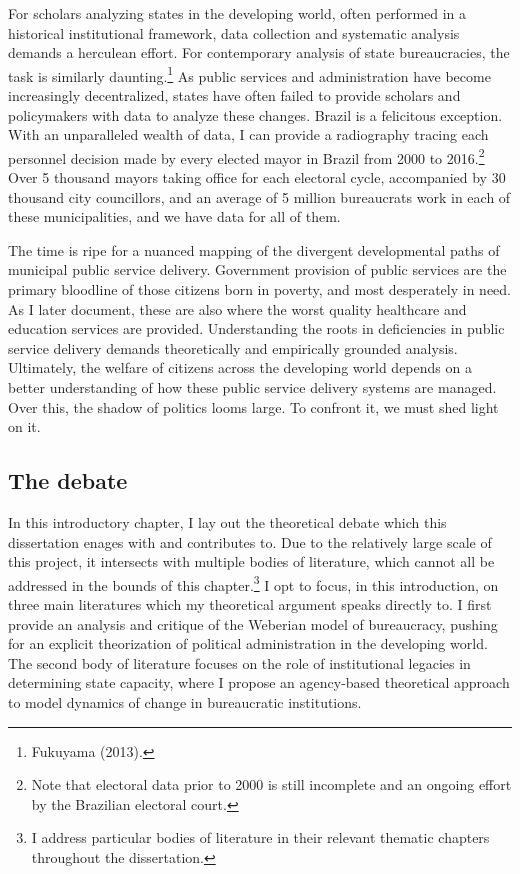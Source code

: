 \documentclass[12pt,]{article}
\let\rmarkdownfootnote\footnote%
\def\footnote{\protect\rmarkdownfootnote}
\begin{document}
For scholars analyzing states in the developing world, often performed
in a historical institutional framework, data collection and systematic
analysis demands a herculean effort. For contemporary analysis of state
bureaucracies, the task is similarly daunting.\footnote{Fukuyama (2013).}
As public services and administration have become increasingly
decentralized, states have often failed to provide scholars and
policymakers with data to analyze these changes. Brazil is a felicitous
exception. With an unparalleled wealth of data, I can provide a
radiography tracing each personnel decision made by every elected mayor
in Brazil from 2000 to 2016.\footnote{Note that electoral data prior to
  2000 is still incomplete and an ongoing effort by the Brazilian
  electoral court.} Over 5 thousand mayors taking office for each
electoral cycle, accompanied by 30 thousand city councillors, and an
average of 5 million bureaucrats work in each of these municipalities,
and we have data for all of them.

The time is ripe for a nuanced mapping of the divergent developmental
paths of municipal public service delivery. Government provision of
public services are the primary bloodline of those citizens born in
poverty, and most desperately in need. As I later document, these are
also where the worst quality healthcare and education services are
provided. Understanding the roots in deficiencies in public service
delivery demands theoretically and empirically grounded analysis.
Ultimately, the welfare of citizens across the developing world depends
on a better understanding of how these public service delivery systems
are managed. Over this, the shadow of politics looms large. To confront
it, we must shed light on it.

\hypertarget{the-debate}{%
\subsection{The debate}\label{the-debate}}

In this introductory chapter, I lay out the theoretical debate which
this dissertation enages with and contributes to. Due to the relatively
large scale of this project, it intersects with multiple bodies of
literature, which cannot all be addressed in the bounds of this
chapter.\footnote{I address particular bodies of literature in their
  relevant thematic chapters throughout the dissertation.} I opt to
focus, in this introduction, on three main literatures which my
theoretical argument speaks directly to. I first provide an analysis and
critique of the Weberian model of bureaucracy, pushing for an explicit
theorization of political administration in the developing world. The
second body of literature focuses on the role of institutional legacies
in determining state capacity, where I propose an agency-based
theoretical approach to model dynamics of change in bureaucratic
institutions.
\end{document}
